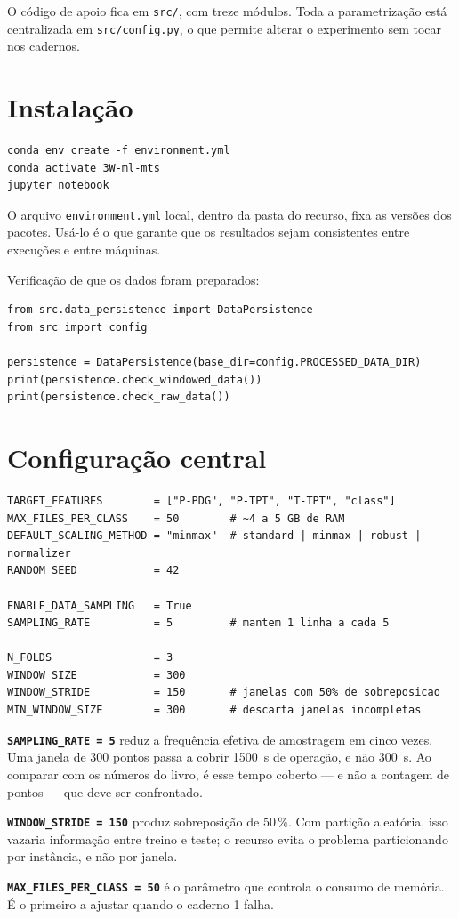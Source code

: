 O código de apoio fica em \texttt{src/}, com treze módulos. Toda a parametrização está
centralizada em \texttt{src/config.py}, o que permite alterar o experimento sem tocar nos
cadernos.

\section{Instalação}

\begin{lstlisting}
conda env create -f environment.yml
conda activate 3W-ml-mts
jupyter notebook
\end{lstlisting}

O arquivo \texttt{environment.yml} local, dentro da pasta do recurso, fixa as versões dos
pacotes. Usá-lo é o que garante que os resultados sejam consistentes entre execuções e
entre máquinas.

Verificação de que os dados foram preparados:

\begin{lstlisting}
from src.data_persistence import DataPersistence
from src import config

persistence = DataPersistence(base_dir=config.PROCESSED_DATA_DIR)
print(persistence.check_windowed_data())
print(persistence.check_raw_data())
\end{lstlisting}

\section{Configuração central}
\label{sec:pratica-config}

\begin{lstlisting}
TARGET_FEATURES        = ["P-PDG", "P-TPT", "T-TPT", "class"]
MAX_FILES_PER_CLASS    = 50        # ~4 a 5 GB de RAM
DEFAULT_SCALING_METHOD = "minmax"  # standard | minmax | robust | normalizer
RANDOM_SEED            = 42

ENABLE_DATA_SAMPLING   = True
SAMPLING_RATE          = 5         # mantem 1 linha a cada 5

N_FOLDS                = 3
WINDOW_SIZE            = 300
WINDOW_STRIDE          = 150       # janelas com 50% de sobreposicao
MIN_WINDOW_SIZE        = 300       # descarta janelas incompletas
\end{lstlisting}

\begin{destaque}
\textbf{\texttt{SAMPLING\_RATE = 5}} reduz a frequência efetiva de amostragem em cinco
vezes. Uma janela de 300 pontos passa a cobrir \SI{1500}{\second} de operação, e não
\SI{300}{\second}. Ao comparar com os números do livro, é esse tempo coberto --- e não a
contagem de pontos --- que deve ser confrontado.

\textbf{\texttt{WINDOW\_STRIDE = 150}} produz sobreposição de $50\,\%$. Com partição
aleatória, isso vazaria informação entre treino e teste; o recurso evita o problema
particionando por instância, e não por janela.

\textbf{\texttt{MAX\_FILES\_PER\_CLASS = 50}} é o parâmetro que controla o consumo de
memória. É o primeiro a ajustar quando o caderno 1 falha.
\end{destaque}


